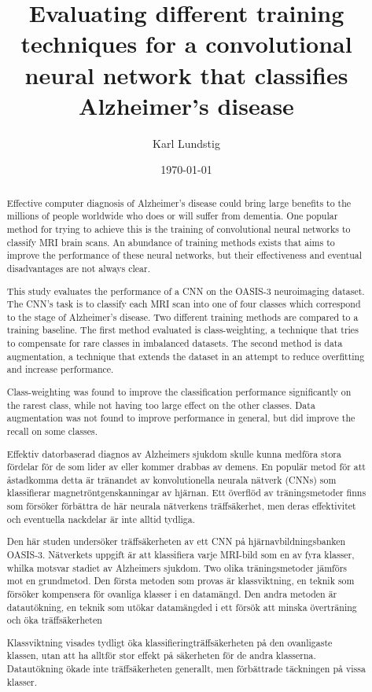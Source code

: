 \documentclass{kththesis}
\title{Evaluating different training techniques for a convolutional neural network that classifies Alzheimer's disease}
\author{Karl Lundstig}
\date{\today}
\begin{document}
\frontmatter

\titlepage

\begin{abstract}
Effective computer diagnosis of Alzheimer's disease could bring large benefits to the millions of people worldwide who does or will suffer from dementia. One popular method for trying to achieve this is the training of convolutional neural networks to classify MRI brain scans. An abundance of training methods exists that aims to improve the performance of these neural networks, but their effectiveness and eventual disadvantages are not always clear.
  
This study evaluates the performance of a CNN on the OASIS-3 neuroimaging dataset. The CNN's task is to classify each MRI scan into one of four classes which correspond to the stage of Alzheimer's disease. Two different training methods are compared to a training baseline. The first method evaluated is class-weighting, a technique that tries to compensate for rare classes in imbalanced datasets. The second method is data augmentation, a technique that extends the dataset in an attempt to reduce overfitting and increase performance.
  
Class-weighting was found to improve the classification performance significantly on the rarest class, while not having too large effect on the other classes. Data augmentation was not found to improve performance in general, but did improve the recall on some classes.

\end{abstract}


\begin{otherlanguage}{swedish}
  \begin{abstract}
    Effektiv datorbaserad diagnos av Alzheimers sjukdom skulle kunna medföra stora fördelar för de som lider av eller kommer drabbas av demens. En populär metod för att åstadkomma detta är tränandet av konvolutionella neurala nätverk (CNNs) som klassifierar magnetröntgenskanningar av hjärnan. Ett överflöd av träningsmetoder finns som försöker förbättra de här neurala nätverkens träffsäkerhet, men deras effektivitet och eventuella nackdelar är inte alltid tydliga.

    Den här studen undersöker träffsäkerheten av ett CNN på hjärnavbildningsbanken OASIS-3. Nätverkets uppgift är att klassifiera varje MRI-bild som en av fyra klasser, whilka motsvar stadiet av Alzheimers sjukdom. Two olika träningsmetoder jämförs mot en grundmetod. Den första metoden som provas är klassviktning, en teknik som försöker kompensera för ovanliga klasser i en datamängd. Den andra metoden är datautökning, en teknik som utökar datamängded i ett försök att minska överträning och öka träffsäkerheten

    Klassviktning visades tydligt öka klassifieringträffsäkerheten på den ovanligaste klassen, utan att ha alltför stor effekt på säkerheten för de andra klasserna. Datautökning ökade inte träffsäkerheten generallt, men förbättrade täckningen på vissa klasser.
  \end{abstract}
\end{otherlanguage}
\end{document}
